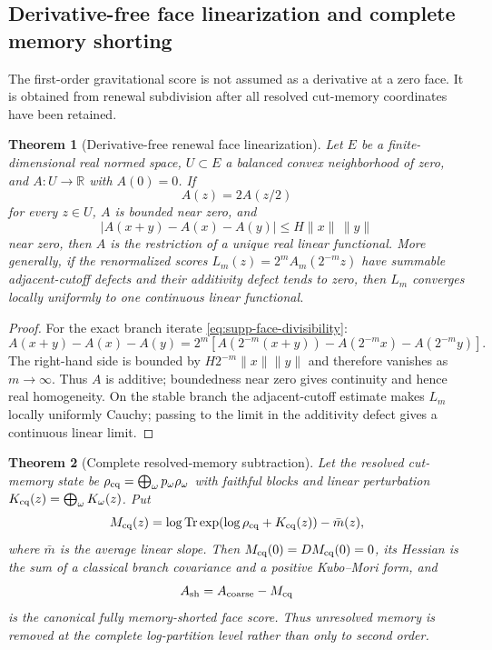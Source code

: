 \documentclass[11pt]{article}
\newtheorem{theorem}{Theorem}[section]
\numberwithin{equation}{section}
\theoremstyle{definition}
\theoremstyle{remark}
\newcommand{\R}{\mathbb R}
\newcommand{\Tr}{\operatorname{Tr}}
\begin{document}
\subsection{Derivative-free face linearization and complete memory shorting}

The first-order gravitational score is not assumed as a derivative at a zero
face.  It is obtained from renewal subdivision after all resolved cut-memory
coordinates have been retained.

\begin{theorem}[Derivative-free renewal face linearization]
\label{thm:supp-face-linearization}
Let $E$ be a finite-dimensional real normed space, $U\subset E$ a balanced
convex neighborhood of zero, and $A:U\to\R$ with $A(0)=0$.  If
\begin{equation}
 A(z)=2A(z/2)
 \label{eq:supp-face-divisibility}
\end{equation}
for every $z\in U$, $A$ is bounded near zero, and
\[
 |A(x+y)-A(x)-A(y)|\le H\|x\|\,\|y\|
\]
near zero, then $A$ is the restriction of a unique real linear functional.
More generally, if the renormalized scores
$L_m(z)=2^mA_m(2^{-m}z)$ have summable adjacent-cutoff defects and their
additivity defect tends to zero, then $L_m$ converges locally uniformly to one
continuous linear functional.
\end{theorem}

\begin{proof}
For the exact branch iterate \eqref{eq:supp-face-divisibility}:
\[
 A(x+y)-A(x)-A(y)
 =2^m[A(2^{-m}(x+y))-A(2^{-m}x)-A(2^{-m}y)].
\]
The right-hand side is bounded by $H2^{-m}\|x\|\|y\|$ and therefore vanishes as
$m\to\infty$.  Thus $A$ is additive; boundedness near zero gives continuity and
hence real homogeneity.  On the stable branch the adjacent-cutoff estimate makes
$L_m$ locally uniformly Cauchy; passing to the limit in the additivity defect
gives a continuous linear limit.
\end{proof}

\begin{theorem}[Complete resolved-memory subtraction]
\label{thm:supp-memory-short}
Let the resolved cut-memory state be
$\rho_{\rm cq}=\bigoplus_\omega p_\omega\rho_\omega$ with faithful blocks and
linear perturbation
$K_{\rm cq}(z)=\bigoplus_\omega K_\omega(z)$.  Put
\begin{equation}
 M_{\rm cq}(z)
 =\log\Tr\exp(\log\rho_{\rm cq}+K_{\rm cq}(z))-\bar m(z),
 \label{eq:supp-memory-logpartition}
\end{equation}
where $\bar m$ is the average linear slope.  Then
$M_{\rm cq}(0)=DM_{\rm cq}(0)=0$, its Hessian is the sum of a classical branch
covariance and a positive Kubo--Mori form, and
\begin{equation}
 A_{\rm sh}=A_{\rm coarse}-M_{\rm cq}
 \label{eq:supp-memory-short}
\end{equation}
is the canonical fully memory-shorted face score.  Thus unresolved memory is
removed at the complete log-partition level rather than only to second order.
\end{theorem}
\end{document}

